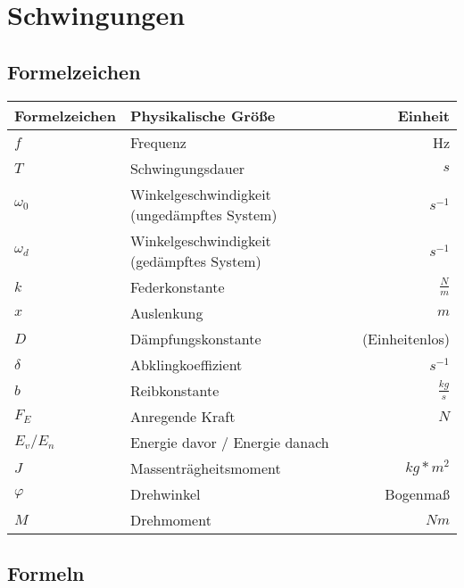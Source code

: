 \documentclass[a4paper, 12pt]{scrreprt}
\begin{document}

\tableofcontents
\listoffigures
\newpage
\linespread{1.5} %


\chapter{Schwingungen}

\section{Formelzeichen}

\begin{center}
  \makegapedcells
  \begin{tabular}{l | l | r}
    Formelzeichen & Physikalische Größe & Einheit\\
    \hline \hline
    \(f\) & Frequenz & Hz\\ \hline
    \(T\) & Schwingungsdauer & \(s\)\\ \hline
    \(\omega _0\) & Winkelgeschwindigkeit (ungedämpftes System) & \(s^{-1}\)\\ \hline
    \(\omega _d\) & Winkelgeschwindigkeit (gedämpftes System) & \(s^{-1}\)\\ \hline
    \(k\) & Federkonstante & \(\frac{N}{m}\)\\ \hline
    \(x\) & Auslenkung & \(m\)\\ \hline
    \(D\) & Dämpfungskonstante & (Einheitenlos)\\ \hline
    \(\delta\) & Abklingkoeffizient & \(s^{-1}\)\\ \hline
    \(b\) & Reibkonstante & \(\frac{kg}{s}\)\\ \hline
    \(F_E\) & Anregende Kraft & \(N\)\\ \hline
    \(E_v/E_n\) & Energie davor / Energie danach\\ \hline
    \(J\) & Massenträgheitsmoment & \(kg*m^2\)\\ \hline
    \(\varphi\) & Drehwinkel & Bogenmaß\\ \hline
    \(M\) & Drehmoment & \(Nm\)\\ \hline
  \end{tabular}
\end{center}


\section{Formeln}
\end{document}
